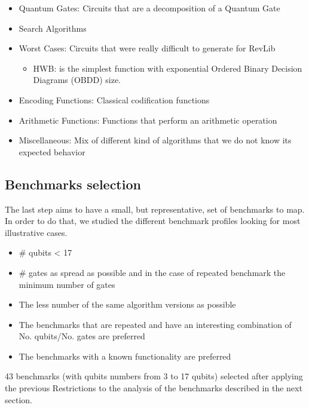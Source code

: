 \begin{itemize}
\item Quantum Gates: Circuits that are a decomposition of a Quantum Gate
\item Search Algorithms
\item Worst Cases: Circuits that were really difficult to generate for RevLib
\begin{itemize}
\item HWB: is the simplest function with exponential Ordered Binary Decision Diagrams (OBDD) size.
\end{itemize}
\item Encoding Functions: Classical codification functions
\item Arithmetic Functions: Functions that perform an arithmetic operation
\item Miscellaneous: Mix of different kind of algorithms that we do not know its expected behavior
\end{itemize}


\subsection*{Benchmarks selection}
\label{sec:org798f8e3}

The last step aims to have a small, but representative, set of benchmarks to map.
In order to do that, we studied the different benchmark profiles looking for most illustrative cases.
\begin{itemize}
\item \# qubits < 17
\item \# gates as spread as possible and in the case of repeated benchmark the minimum number of gates
\item The less number of the same algorithm versions as possible
\item The benchmarks that are repeated and have an interesting combination of No. qubits/No. gates are preferred
\item The benchmarks with a known functionality are preferred
\end{itemize}
43 benchmarks (with qubits numbers from 3 to 17 qubits) selected after applying the previous Restrictions to the analysis of the benchmarks described in the next section.

